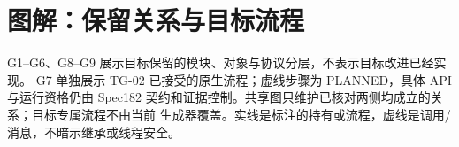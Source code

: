 \clearpage
\section{图解：保留关系与目标流程}
\label{sec:target-diagrams}
G1--G6、G8--G9 展示目标保留的模块、对象与协议分层，不表示目标改进已经实现。
G7 单独展示 TG-02 已接受的原生流程；虚线步骤为 PLANNED，具体 API 与运行资格仍由
Spec182 契约和证据控制。共享图只维护已核对两侧均成立的关系；目标专属流程不由当前
生成器覆盖。实线是标注的持有或流程，虚线是调用/消息，不暗示继承或线程安全。










